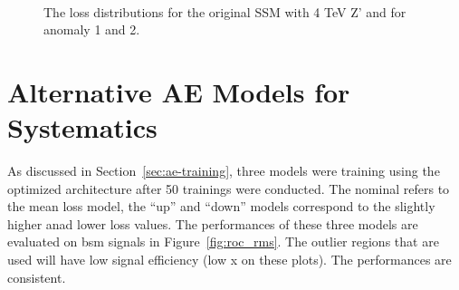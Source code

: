 \begin{figure}[H]
\begin{center}
{        } \\
    \end{center}
        \caption{
            The loss distributions for the original SSM with 4 TeV Z' and for anomaly 1 and 2.
        }
\label{fig:SSM_losses}
\end{figure}

\newpage

\vspace*{0.5in}

\section{Alternative AE Models for Systematics}
\label{appendix:ae-systematics}
\setcounter{equation}{0}

As discussed in Section~\ref{sec:ae-training}, three models were training using the optimized architecture after 50 trainings were conducted. The nominal refers to the mean 
loss model, the ``up'' and ``down'' models correspond to the slightly higher anad lower loss values. The performances of these three models are evaluated on \gls{bsm} signals in 
Figure~\ref{fig:roc_rms}. The outlier regions that are used will have low signal efficiency (low x on these plots). The performances are consistent.

